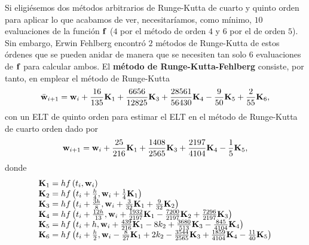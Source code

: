 Si eligiésemos dos métodos arbitrarios de Runge-Kutta de cuarto y quinto orden
para aplicar lo que acabamos de ver,
necesitaríamos, como mínimo, $10$ evaluaciones de la función $\vb{f}$
($4$ por el método de orden $4$ y $6$ por el de orden $5$).
Sin embargo, Erwin Fehlberg encontró $2$ métodos de Runge-Kutta de estos órdenes
que se pueden anidar de manera que
se necesiten tan solo $6$ evaluaciones de $\vb{f}$ para calcular ambos.
El \textbf{método de Runge-Kutta-Fehlberg} consiste, por tanto, en
emplear el método de Runge-Kutta
\begin{equation*}
    \bar{\vb{w}}_{i+1} = \vb{w}_i + \frac{16}{135}\vb{K}_1 + \frac{6656}{12825}\vb{K}_3 + \frac{28561}{56430}\vb{K}_4 - \frac{9}{50}\vb{K}_5 + \frac{2}{55}\vb{K}_6,
\end{equation*}
con un ELT de quinto orden para estimar el ELT
en el método de Runge-Kutta de cuarto orden dado por 
\begin{equation*}
    \vb{w}_{i+1} = \vb{w}_i + \frac{25}{216}\vb{K}_1 + \frac{1408}{2565}\vb{K}_3 + \frac{2197}{4104}\vb{K}_4 - \frac{1}{5}\vb{K}_5,
\end{equation*}
donde 
\begin{equation*}
\begin{array}{l}
    \vb{K}_1 =  hf\left(t_i, \vb{w}_i\right)\\
    \vb{K}_2 =  hf\left(t_i + \frac{h}{4}, \vb{w}_i + \frac{1}{4}\vb{K}_1\right)\\
    \vb{K}_3 =  hf\left(t_i + \frac{3h}{8}, \vb{w}_i + \frac{3}{32}\vb{K}_1 +  \frac{9}{32}\vb{K}_2\right)\\
    \vb{K}_4 = hf\left(t_i + \frac{12h}{13}, \vb{w}_i + \frac{1932}{2197}\vb{K}_1 -   \frac{7200}{2197}\vb{K}_2 +  \frac{7296}{2197}\vb{K}_3\right) \\
    \vb{K}_5 = hf\left(t_i + h, \vb{w}_i + \frac{439}{216}\vb{K}_1 - 8k_2 +  \frac{3680}{513}\vb{K}_3 - \frac{845}{4104}\vb{K}_4\right) \\
    \vb{K}_6 = hf\left(t_i + \frac{h}{2}, \vb{w}_i - \frac{8}{27}\vb{K}_1 + 2k_2 -  \frac{3544}{2565}\vb{K}_3 + \frac{1859}{4104}\vb{K}_4 - \frac{11}{40}\vb{K}_5\right)
\end{array}
\end{equation*}
